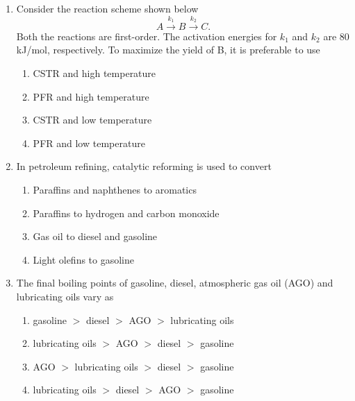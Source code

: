 \documentclass[journal,12pt,onecolumn]{IEEEtran}
\theoremstyle{remark}
\begin{document}
\begin{enumerate}
\item Consider the reaction scheme shown below
\[A \xrightarrow{k_1} B \xrightarrow{k_2} C.\]
Both the reactions are first-order. The activation energies for $k_1$ and $k_2$ are $80$ kJ/mol, respectively. To maximize the yield of B, it is preferable to use
\hfill{}
\begin{enumerate}
    \item CSTR and high temperature
    \item PFR and high temperature
    \item CSTR and low temperature
    \item PFR and low temperature
\end{enumerate}

\item In petroleum refining, catalytic reforming is used to convert
\hfill{}
\begin{enumerate}
    \item Paraffins and naphthenes to aromatics
    \item Paraffins to hydrogen and carbon monoxide
    \item Gas oil to diesel and gasoline
    \item Light olefins to gasoline
\end{enumerate}

\item The final boiling points of gasoline, diesel, atmospheric gas oil (AGO) and lubricating oils vary as
\hfill{}
\begin{enumerate}
    \item gasoline $>$ diesel $>$ AGO $>$ lubricating oils
    \item lubricating oils $>$ AGO $>$ diesel $>$ gasoline
    \item AGO $>$ lubricating oils $>$ diesel $>$ gasoline
    \item lubricating oils $>$ diesel $>$ AGO $>$ gasoline
\end{enumerate}


\end{enumerate}
\end{document}
